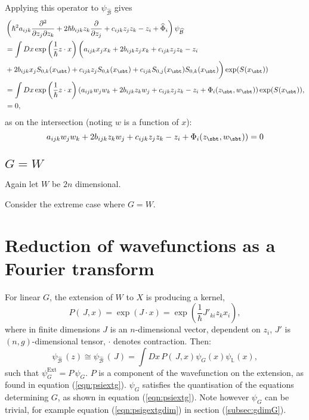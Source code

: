     Applying this operator to \( \psi_{\widehat{\mathcal{B}}}\) gives
    \begin{align*}
    &\left(\hslash^2 a_{ijk} \frac{\partial^2}{\partial z_j \partial z_k} +  2 \hslash b_{ijk}  z_k \frac{\partial}{\partial z_j} + c_{ijk}z_j z_k - z_i  + \widehat{\Phi}_i \right) \psi_{\widehat{\mathcal{B}}}\\ 
    &= \int Dx  \exp\left( \frac{1}{\hslash} z \cdot x\right) \bigg(  a_{ijk}  x_j x_k + 2  b_{ijk} z_j x_k   + c_{ijk} z_j z_k   - z_i  \\
    & + 2 b_{ijk} x_j S_{0,k}(x_{\sbt}) + c_{ijk} z_j S_{0,k}(x_{\sbt}) + c_{ijk} S_{0,j}(x_{\sbt}) S_{0,k}(x_{\sbt})\bigg)  \exp(S(x_{\sbt}))\\
    &= \int Dx \exp\left( \frac{1}{\hslash} z \cdot x\right) (  a_{ijk}w_j w_k + 2 b_{ijk}z_k w_j+ c_{ijk}z_j z_k - z_i   +  \Phi_i(z_{\sbt},w_{\sbt})  ) \exp(S(x_{\sbt})), \\
    &= 0,
    \end{align*}
    as on the intersection (noting \(w\) is a function of \(x\)): 
    \[  a_{ijk}w_j w_k + 2 b_{ijk}z_k w_j+ c_{ijk}z_j z_k - z_i   +  \Phi_i(z_{\sbt},w_{\sbt})  ) = 0\]
    
    
    \subsection{\texorpdfstring{\(G=W\)}{G=W}}

    Again let \(W\) be \(2n\) dimensional. 
    \begin{ex}
    Consider the extreme case where \(G= W\).
    \end{ex}
    
    
    \section{Reduction of wavefunctions as a Fourier transform}
    
    For linear \(G\), the extension of \(W\) to  \( X\) is producing a kernel, \[P(\,J,x) = \exp(J\cdot x) =  \exp\left( \frac{1}{\hslash }J'_{ki}z_k x_i  \right) ,\] where in finite dimensions \(J\) is an \( n\)-dimensional vector, dependent on \(z_i\), \(J'\) is \((n,g)\)-dimensional tensor, \(\cdot\) denotes contraction. Then:
    \[  \psi_{\widehat{\mathcal{B}}}\,(z) \cong \psi_{\widehat{\mathcal{B}}}\,(\,J) =\int Dx\,P(\,J,x) \psi_G(x) \psi_{\mathbb{L}}(x),\]
    such that \( \psi_{G}^{\mathrm{Ext}} = P\, \psi_G\). \(P\) is a component of the wavefunction on the extension, as found in equation (\ref{eqn:psiextg}). \( \psi_G\) satisfies the quantisation of the equations determining \(G\), as shown in equation (\ref{eqn:psiextg}). Note however \( \psi_G\) can be trivial, for example equation (\ref{eqn:psigextgdim}) in section (\ref{subsec:gdimG}).
    
